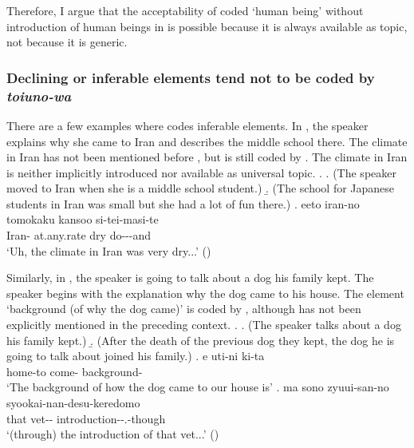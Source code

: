 Therefore,
I argue that the acceptability of  coded `human being' without introduction of human beings in \LLast is possible
because it is always available as topic,
not because it is generic.


\subsubsection{Declining or inferable elements tend not to be coded by \textit{toiuno-wa}}\label{Toiuno-waInfSemiActUnuse}

There are a few examples
where  codes inferable elements.
In \Next,
the speaker explains why she came to Iran and describes the middle school there.
The climate in Iran has not been mentioned before \Next[c],
but is still coded by .
The climate in Iran is neither implicitly introduced nor available as universal topic.
\ex. \label{IranClimate}
 \a. (The speaker moved to Iran when she is a middle school student.)
 \b. (The school for Japanese students in Iran was small but she had a lot of fun there.)
 \bg. eeto iran-no  tomokaku kansoo si-tei-masi-te \\
 	 Iran-  at.any.rate dry do---and \\
	`Uh, the climate in Iran was very dry...'
	\hfill{()}
%

Similarly, in \Next[c],
the speaker is going to talk about a dog his family kept.
The speaker begins with the explanation why the dog came to his house.
The element  `background (of why the dog came)' is coded by ,
although  has not been explicitly mentioned in the preceding context.
%
\ex.
 \a. (The speaker talks about a dog his family kept.)
 \b. (After the death of the previous dog they kept, the dog he is going to talk about joined his family.)
 \bg. e uti-ni ki-ta  \\
 	 home-to come- background- \\
	`The background of how the dog came to our house is'
 \bg. ma sono zyuui-san-no syookai-nan-desu-keredomo \\
 	 that vet-- introduction--.-though \\
	`(through) the introduction of that vet...'
	\hfill{()}


